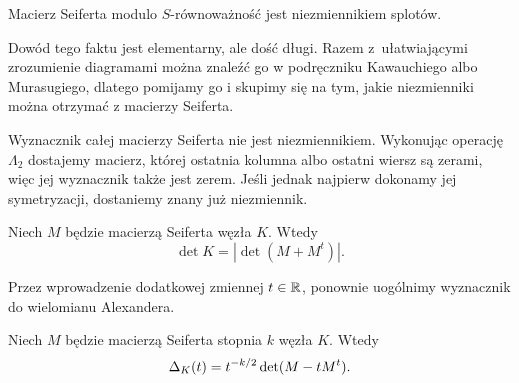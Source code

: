 \begin{proposition}
    Macierz Seiferta modulo $S$-równoważność jest niezmiennikiem splotów.
\end{proposition}

Dowód tego faktu jest elementarny, ale dość długi.
Razem z~ułatwiającymi zrozumienie diagramami można znaleźć go w podręczniku Kawauchiego \cite[s. 64]{kawauchi1996} albo Murasugiego, dlatego pomijamy go i skupimy się na tym, jakie niezmienniki można otrzymać z macierzy Seiferta.

Wyznacznik całej macierzy Seiferta nie jest niezmiennikiem.
Wykonując operację $\Lambda_2$ dostajemy macierz, której ostatnia kolumna albo ostatni wiersz są zerami, więc jej wyznacznik także jest zerem.
Jeśli jednak najpierw dokonamy jej symetryzacji, dostaniemy znany już niezmiennik.

\begin{proposition}
%
    Niech $M$ będzie macierzą Seiferta węzła $K$.
    Wtedy
    \begin{equation}
        \det K = |\det(M + M^t)|.
    \end{equation}
\end{proposition}

%
Przez wprowadzenie dodatkowej zmiennej $t \in \mathbb R$, ponownie uogólnimy wyznacznik do wielomianu Alexandera.

\begin{proposition}
    Niech $M$ będzie macierzą Seiferta stopnia $k$ węzła $K$.
    Wtedy
    \begin{equation}
        \Delta_K (t) = t^{-k/2}\det(M - tM^t).
    \end{equation}
\end{proposition}


